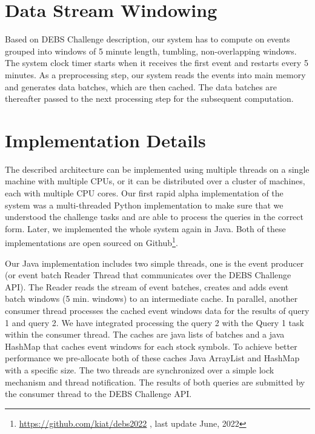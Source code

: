 \section{Data Stream Windowing}\label{sec:windows}
Based on DEBS Challenge \cite{debs2022challenge} description, our system has to compute on events grouped into windows of 5 minute length, tumbling,
non-overlapping windows. The system clock timer starts when it receives the first event and restarts every 5 minutes. As a preprocessing step, our system reads the events
into main memory and generates data batches, which are then cached. The data batches are thereafter passed to the next processing step for the subsequent computation.
    
    
\section{Implementation Details}\label{sec:implementation}
The described architecture can be implemented using multiple threads on a single machine with multiple CPUs, or it can be distributed over a cluster of machines, each with multiple CPU cores.
Our first rapid alpha implementation of the system was a multi-threaded Python implementation to make sure that we understood the challenge tasks and are able to process the queries in the correct form.
Later, we implemented the whole system again in Java. Both of these implementations are open sourced on Github\footnote{\url{https://github.com/kiat/debs2022} , last update June, 2022}.

Our Java implementation includes two simple threads, one is the event producer (or event batch Reader Thread that communicates over the DEBS Challenge API). 
The Reader reads the stream of event batches, creates and adds event batch windows (5 min. windows) to an intermediate cache. In parallel, another consumer thread processes the cached event windows data 
for the results of query 1 and query 2. We have integrated processing the query 2 with the Query 1 task within the consumer thread. 
The caches are java lists of batches and a java HashMap that caches event windows for each stock symbols. 
To achieve better performance we pre-allocate both of these caches Java ArrayList and HashMap with a specific size. 
The two threads are synchronized over a simple lock mechanism and thread notification. The results of both queries are submitted by the consumer thread to the DEBS Challenge API.





